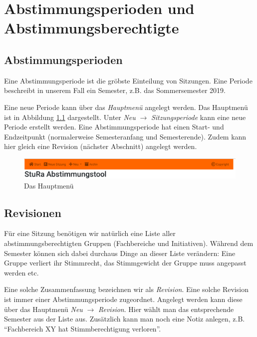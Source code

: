 %
%

\chapter{Abstimmungsperioden und Abstimmungsberechtigte}
\section*{Abstimmungsperioden}
Eine Abstimmungsperiode ist die gröbste Einteilung von Sitzungen.
Eine Periode beschreibt in unserem Fall ein Semester, z.B. das Sommersemester
2019.

Eine neue Periode kann über das \emph{Hauptmenü} angelegt werden.
Das Hauptmenü ist in Abbildung \ref{fig:main-menu} dargestellt.
Unter \emph{Neu} $\rightarrow$ \emph{Sitzungsperiode} kann eine neue Periode
erstellt werden.
Eine Abstimmungsperiode hat einen Start- und Endzeitpunkt (normalerweise
Semesteranfang und Semesterende).
Zudem kann hier gleich eine Revision (nächster Abschnitt) angelegt werden.

\begin{figure}
\includegraphics[width=\textwidth]{../images/main_menu}
\caption{Das Hauptmenü}
\label{fig:main-menu}
\end{figure}

\section*{Revisionen}
Für eine Sitzung benötigen wir natürlich eine Liste aller abstimmungsberechtigten
Gruppen (Fachbereiche und Initiativen).
Während dem Semester können sich dabei durchaus Dinge an dieser Liste verändern:
Eine Gruppe verliert ihr Stimmrecht, das Stimmgewicht der Gruppe muss angepasst
werden etc.

Eine solche Zusammenfassung bezeichnen wir als \emph{Revision}.
Eine solche Revision ist immer einer Abstimmungsperiode zugeordnet.
Angelegt werden kann diese über das Hauptmenü \emph{Neu} $\rightarrow$
\emph{Revision}.
Hier wählt man das entsprechende Semester aus der Liste aus.
Zusätzlich kann man noch eine Notiz anlegen, z.B. ``Fachbereich XY hat Stimmberechtigung verloren''.

